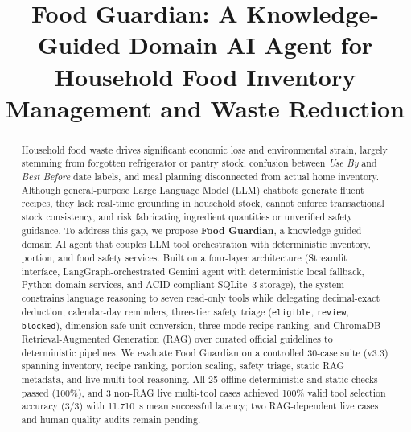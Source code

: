 \documentclass[conference]{IEEEtran}
\begin{document}
\title{Food Guardian: A Knowledge-Guided Domain AI Agent for Household Food Inventory Management and Waste Reduction}

\author{
}

\maketitle

\begin{abstract}
Household food waste drives significant economic loss and environmental strain, largely stemming from forgotten refrigerator or pantry stock, confusion between \emph{Use By} and \emph{Best Before} date labels, and meal planning disconnected from actual home inventory.
Although general-purpose Large Language Model (LLM) chatbots generate fluent recipes, they lack real-time grounding in household stock, cannot enforce transactional stock consistency, and risk fabricating ingredient quantities or unverified safety guidance.
To address this gap, we propose \textbf{Food Guardian}, a knowledge-guided domain AI agent that couples LLM tool orchestration with deterministic inventory, portion, and food safety services.
Built on a four-layer architecture (Streamlit interface, LangGraph-orchestrated Gemini agent with deterministic local fallback, Python domain services, and ACID-compliant SQLite~3 storage), the system constrains language reasoning to seven read-only tools while delegating decimal-exact deduction, calendar-day reminders, three-tier safety triage (\texttt{eligible}, \texttt{review}, \texttt{blocked}), dimension-safe unit conversion, three-mode recipe ranking, and ChromaDB Retrieval-Augmented Generation (RAG) over curated official guidelines to deterministic pipelines.
We evaluate Food Guardian on a controlled 30-case suite (v3.3) spanning inventory, recipe ranking, portion scaling, safety triage, static RAG metadata, and live multi-tool reasoning.
All 25 offline deterministic and static checks passed (100\%), and 3 non-RAG live multi-tool cases achieved 100\% valid tool selection accuracy (3/3) with 11.710~s mean successful latency; two RAG-dependent live cases and human quality audits remain pending.
\end{abstract}
\end{document}
